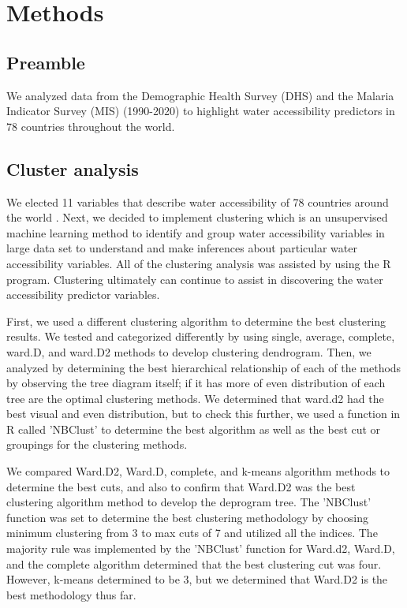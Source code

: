 \documentclass[10pt,twoside]{article}
\numberwithin{equation}{section}
\newcommand{\?}{\stackrel{?}{=}}
\begin{document}
\section*{Methods}

\subsection*{Preamble}
We analyzed data from the Demographic Health Survey (DHS) and the Malaria Indicator Survey (MIS) (1990-2020) to highlight water accessibility predictors in 78 countries throughout the world.

\subsection*{Cluster analysis}
We elected 11 variables that describe water accessibility of 78 countries around the world \citep{price2019difference}. Next, we decided to implement clustering which is an unsupervised machine learning method to identify and group water accessibility variables in large data set to understand and make inferences about particular water accessibility variables. All of the clustering analysis was assisted by using the R program. Clustering ultimately can continue to assist in discovering the water accessibility predictor variables. 

First, we used a different clustering algorithm to determine the best clustering results. We tested and categorized differently by using single, average, complete, ward.D, and ward.D2 methods to develop clustering dendrogram. Then, we analyzed by determining the best hierarchical relationship of each of the methods by observing the tree diagram itself; if it has more of even distribution of each tree are the optimal clustering methods. We determined that ward.d2 had the best visual and even distribution, but to check this further, we used a function in R called 'NBClust' to determine the best algorithm as well as the best cut or groupings for the clustering methods. 

We compared Ward.D2, Ward.D, complete, and k-means algorithm methods to determine the best cuts, and also to confirm that Ward.D2 was the best clustering algorithm method to develop the deprogram tree. The 'NBClust' function was set to determine the best clustering methodology by choosing minimum clustering from 3 to max cuts of 7 and utilized all the indices.  The majority rule was implemented by the 'NBClust' function for Ward.d2, Ward.D, and the complete algorithm determined that the best clustering cut was four. However, k-means determined to be 3, but we determined that Ward.D2 is the best methodology thus far. 
\end{document}
